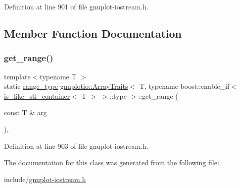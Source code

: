 Definition at line 901 of file gnuplot-\/iostream.\+h.



\subsection{Member Function Documentation}
\mbox{\label{classgnuplotio_1_1_array_traits_3_01_t_00_01typename_01boost_1_1enable__if_3_01is__like__stl__co9e1736bbd08cd58c6993ab613a998887_a89d4150ab3c479cde972071a10acd27b}} 
\subsubsection{\texorpdfstring{get\+\_\+range()}{get\_range()}}
{\footnotesize\ttfamily template$<$typename T $>$ \\
static \hyperlink{classgnuplotio_1_1_array_traits_3_01_t_00_01typename_01boost_1_1enable__if_3_01is__like__stl__co9e1736bbd08cd58c6993ab613a998887_ab702072abbe018bbc90b9967ca8c4b42}{range\+\_\+type} \hyperlink{classgnuplotio_1_1_array_traits}{gnuplotio\+::\+Array\+Traits}$<$ T, typename boost\+::enable\+\_\+if$<$ \hyperlink{structgnuplotio_1_1is__like__stl__container}{is\+\_\+like\+\_\+stl\+\_\+container}$<$ T $>$ $>$\+::type $>$\+::get\+\_\+range (\begin{DoxyParamCaption}\item[{const T \&}]{arg }\end{DoxyParamCaption})\hspace{0.3cm}{\ttfamily [inline]}, {\ttfamily [static]}}



Definition at line 903 of file gnuplot-\/iostream.\+h.



The documentation for this class was generated from the following file\+:\begin{DoxyCompactItemize}
\item 
include/\hyperlink{gnuplot-iostream_8h}{gnuplot-\/iostream.\+h}\end{DoxyCompactItemize}
